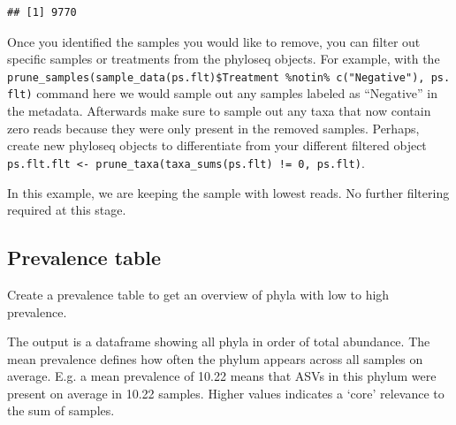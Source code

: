 \documentclass[
]{book}
\newenvironment{Shaded}{\begin{snugshade}}{\end{snugshade}}
\newcommand{\CommentTok}[1]{\textcolor[rgb]{0.56,0.35,0.01}{\textit{#1}}}
\begin{document}
\begin{verbatim}
## [1] 9770
\end{verbatim}

\begin{Shaded}
\end{Shaded}

Once you identified the samples you would like to remove, you can filter out specific samples or treatments from the phyloseq objects. For example, with the \texttt{prune\_samples(sample\_data(ps.flt)\$Treatment\ \%notin\%\ c("Negative"),\ ps.flt)} command here we would sample out any samples labeled as ``Negative'' in the metadata. Afterwards make sure to sample out any taxa that now contain zero reads because they were only present in the removed samples. Perhaps, create new phyloseq objects to differentiate from your different filtered object \texttt{ps.flt.flt\ \textless{}-\ prune\_taxa(taxa\_sums(ps.flt)\ !=\ 0,\ ps.flt)}.

In this example, we are keeping the sample with lowest reads. No further filtering required at this stage.

\hfill\break

\hypertarget{prevalence-table}{%
\subsection{Prevalence table}\label{prevalence-table}}

Create a prevalence table to get an overview of phyla with low to high prevalence.

The output is a dataframe showing all phyla in order of total abundance. The mean prevalence defines how often the phylum appears across all samples on average. E.g. a mean prevalence of 10.22 means that ASVs in this phylum were present on average in 10.22 samples. Higher values indicates a `core' relevance to the sum of samples.
\end{document}
